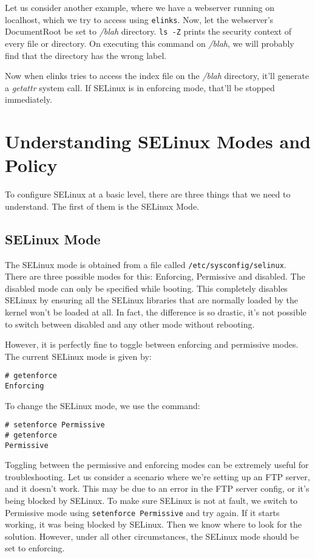 Let us consider another example, where we have a webserver running on localhost, which we try to access using \verb|elinks|. Now, let the webserver's DocumentRoot be set to \textit{/blah} directory. \verb|ls -Z| prints the security context of every file or directory. On executing this command on \textit{/blah}, we will probably find that the directory has the wrong label. 

Now when elinks tries to access the index file on the \textit{/blah} directory, it'll generate a \textit{getattr} system call. If SELinux is in enforcing mode, that'll be stopped immediately. 

\section{Understanding SELinux Modes and Policy}
To configure SELinux at a basic level, there are three things that we need to understand. The first of them is the SELinux Mode. 

\subsection{SELinux Mode}
The SELinux mode is obtained from a file called \verb|/etc/sysconfig/selinux|. There are three possible modes for this: Enforcing, Permissive and disabled. The disabled mode can only be specified while booting. This completely disables SELinux by ensuring all the SELinux libraries that are normally loaded by the kernel won't be loaded at all. In fact, the difference is so drastic, it's not possible to switch between disabled and any other mode without rebooting. 

However, it is perfectly fine to toggle between enforcing and permissive modes. The current SELinux mode is given by:

\vspace{-15pt}
\begin{verbatim}
# getenforce
Enforcing
\end{verbatim}
\vspace{-10pt}

\noindent
To change the SELinux mode, we use the command:

\vspace{-15pt}
\begin{verbatim}
# setenforce Permissive
# getenforce
Permissive
\end{verbatim}
\vspace{-10pt}

\noindent
Toggling between the permissive and enforcing modes can be extremely useful for troubleshooting. Let us consider a scenario where we're setting up an FTP server, and it doesn't work. This may be due to an error in the FTP server config, or it's being blocked by SELinux. To make sure SELinux is not at fault, we switch to Permissive mode using \verb|setenforce Permissive| and try again. If it starts working, it was being blocked by SELinux. Then we know where to look for the solution. However, under all other circumstances, the SELinux mode should be set to enforcing. 

